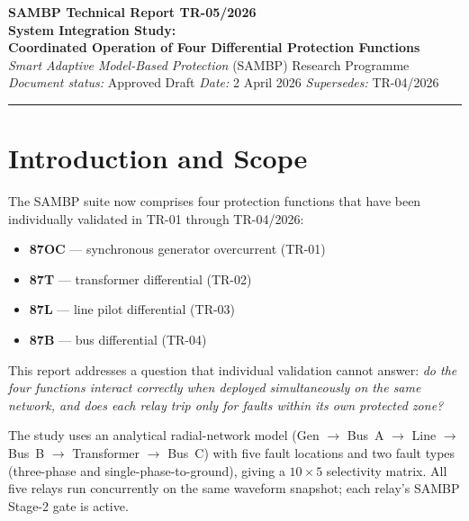\documentclass[12pt,a4paper]{article}
\begin{document}

\begin{center}
  {\Large\bfseries SAMBP Technical Report TR-05/2026}\\[6pt]
  {\large\bfseries System Integration Study:\\
   Coordinated Operation of Four Differential Protection Functions}\\[10pt]
  {\normalsize
    \textit{Smart Adaptive Model-Based Protection} (SAMBP) Research Programme}\\[4pt]
  {\small\textit{Document status:} Approved Draft \quad
         \textit{Date:} 2 April 2026 \quad
         \textit{Supersedes:} TR-04/2026}\\[2pt]
  \rule{\linewidth}{0.6pt}
\end{center}

\tableofcontents
\listoftables
\listoffigures
\newpage

\section{Introduction and Scope}

The SAMBP suite now comprises four protection functions that have been
individually validated in TR-01 through TR-04/2026:

\begin{itemize}
  \item \textbf{87OC} --- synchronous generator overcurrent (TR-01)
  \item \textbf{87T}  --- transformer differential (TR-02)
  \item \textbf{87L}  --- line pilot differential (TR-03)
  \item \textbf{87B}  --- bus differential (TR-04)
\end{itemize}

\noindent
This report addresses a question that individual validation cannot answer:
\emph{do the four functions interact correctly when deployed simultaneously
on the same network, and does each relay trip only for faults within its own
protected zone?}

The study uses an analytical radial-network model
(Gen $\!\to\!$ Bus~A $\!\to\!$ Line $\!\to\!$ Bus~B $\!\to\!$ Transformer
$\!\to\!$ Bus~C) with five fault locations and two fault types
(three-phase and single-phase-to-ground), giving a $10 \times 5$
selectivity matrix.  All five relays run concurrently on the same waveform
snapshot; each relay's SAMBP Stage-2 gate is active.
\end{document}
